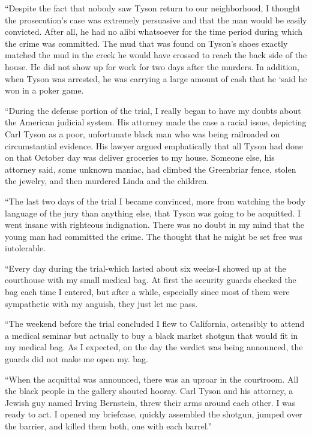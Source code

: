 \documentclass[]{article}
\begin{document}
{“Despite the fact that nobody saw Tyson return to our neighborhood, I thought the prosecution’s case was extremely persuasive and that the man would be easily convicted. After all, he had no alibi whatsoever for the time period during which the crime was committed. The mud that was found on Tyson’s shoes exactly matched the mud in the creek he would have crossed to reach the back side of the house. He did not show up for work for two days after the murders. In addition, when Tyson was arrested, he was carrying a large amount of cash that he ‘said he won in a poker game.

“During the defense portion of the trial, I really began to have my doubts about the American judicial system. His attorney made the case a racial issue, depicting Carl Tyson as a poor, unfortunate black man who was being railroaded on circumstantial evidence. His lawyer argued emphatically that all Tyson had done on that October day was deliver groceries to my house. Someone else, his attorney said, some unknown maniac, had climbed the Greenbriar fence, stolen the jewelry, and then murdered Linda and the children.

“The last two days of the trial I became convinced, more from watching the body language of the jury than anything else, that Tyson was going to be acquitted. I went insane with righteous indignation. There was no doubt in my mind that the young man had committed the crime. The thought that he might be set free was intolerable.

“Every day during the trial-which lasted about six weeks-I showed up at the courthouse with my small medical bag. At first the security guards checked the bag each time I entered, but after a while, especially since most of them were sympathetic with my anguish, they just let me pass.

“The weekend before the trial concluded I flew to California, ostensibly to attend a medical seminar but actually to buy a black market shotgun that would fit in my medical bag. As I expected, on the day the verdict was being announced, the guards did not make me open my. bag.

“When the acquittal was announced, there was an uproar in the courtroom. All the black people in the gallery shouted hooray. Carl Tyson and his attorney, a Jewish guy named Irving Bernstein, threw their arms around each other. I was ready to act. I opened my briefcase, quickly assembled the shotgun, jumped over the barrier, and killed them both, one with each barrel.”

}
\end{document}
